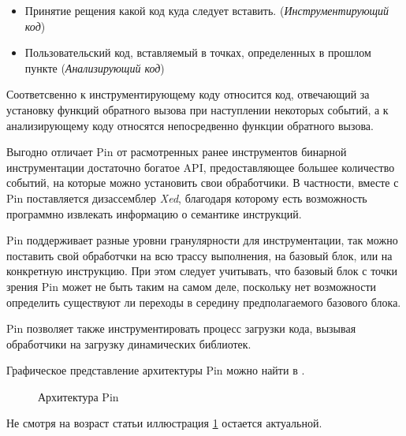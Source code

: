 \begin{itemize}
    \item Принятие рещения какой код куда следует вставить. (\emph{Инструментирующий код})
    \item Пользовательский код, вставляемый в точках, определенных в прошлом пункте (\emph{Анализирующий код})
\end{itemize}

Соответсвенно к инструментирующему коду относится код, отвечающий за установку функций обратного вызова при наступлении некоторых событий, а к анализирующему коду относятся непосредвенно функции обратного вызова.

Выгодно отличает Pin от расмотренных ранее инструментов бинарной инструментации достаточно богатое API, предоставляющее большее количество событий, на которые можно установить свои обработчики. В частности, вместе с Pin поставляется дизассемблер \emph{Xed}, благодаря которому есть возможность программно извлекать информацию о семантике инструкций.

Pin поддерживает разные уровни гранулярности для инструментации, так можно поставить свой обработчки на всю трассу выполнения, на базовый блок, или на конкретную инструкцию. При этом следует учитывать, что базовый блок с точки зрения Pin может не быть таким на самом деле, поскольку нет возможности определить существуют ли переходы в середину предполагаемого базового блока.

Pin позволяет также инструментировать процесс загрузки кода, вызывая обработчики на загрузку динамических библиотек.

Графическое представление архитектуры Pin можно найти в \cite{PIN}.
\begin{figure}[H]
    \caption{Архитектура Pin}
    \label{fig:pin}
\end{figure}
Не смотря на возраст статьи иллюстрация \ref{fig:pin} остается актуальной.


